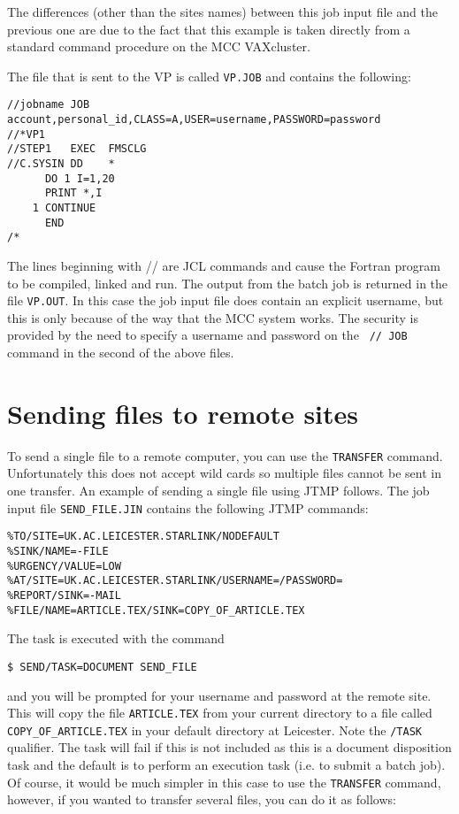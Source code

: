 The differences (other than the sites names) between this job input file and
the previous one are due to the fact that this example is taken directly from a
standard command procedure on the MCC VAXcluster.

The file that is sent to the VP is called {\tt VP.JOB} and contains the
following:

\begin{verbatim}
//jobname JOB account,personal_id,CLASS=A,USER=username,PASSWORD=password
//*VP1
//STEP1   EXEC  FMSCLG
//C.SYSIN DD    *
      DO 1 I=1,20
      PRINT *,I
    1 CONTINUE
      END
/*
\end{verbatim}

The lines beginning with // are JCL commands and cause the Fortran program to be
compiled, linked and run. The output from the batch job is returned in the file
{\tt VP.OUT}. In this case the job input file does contain an explicit
username, but this is only because of the way that the MCC system works. The
security is provided by the need to specify a username and password on the {\tt
//~JOB} command in the second of the above files.

\section{Sending files to remote sites}

To send a single file to a remote computer, you can use the {\tt TRANSFER}
command. Unfortunately this does not accept wild cards so multiple files
cannot be sent in one transfer. An example of sending a single file using
JTMP follows.
The job input file {\tt SEND\_FILE.JIN} contains the following JTMP commands:

\begin{verbatim}
%TO/SITE=UK.AC.LEICESTER.STARLINK/NODEFAULT
%SINK/NAME=-FILE
%URGENCY/VALUE=LOW
%AT/SITE=UK.AC.LEICESTER.STARLINK/USERNAME=/PASSWORD=
%REPORT/SINK=-MAIL
%FILE/NAME=ARTICLE.TEX/SINK=COPY_OF_ARTICLE.TEX
\end{verbatim}

The task is executed with the command

\begin{verbatim}
$ SEND/TASK=DOCUMENT SEND_FILE
\end{verbatim}

and you will be prompted for your username and password at the remote site. This
will copy the file {\tt ARTICLE.TEX} from your current directory to a file
called {\tt COPY\_OF\_ARTICLE.TEX} in your default directory at Leicester. Note
the {\tt /TASK} qualifier. The task will fail if this is not included as this
is a document disposition task and the default is to perform an execution task
(i.e. to submit a batch job). Of course, it would be much simpler in this case
to use the {\tt TRANSFER} command, however, if you wanted to transfer several
files, you can do it as follows:

